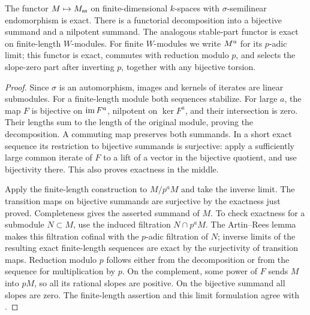 \begin{lemma}\label{lem:A-fitting}
 The functor $M\mapsto M_{\ss}$ on finite-dimensional
$k$-spaces with $\sigma$-semilinear endomorphism is exact.  There is a
functorial decomposition into a bijective summand and a nilpotent summand.
The analogous stable-part functor is exact on finite-length $W$-modules.
For finite $W$-modules we write $M^{\rm u}$ for its $p$-adic limit; this
functor is exact, commutes with reduction modulo $p$, and selects the
slope-zero part after inverting $p$, together with any bijective torsion.
\end{lemma}
\begin{proof}
Since $\sigma$ is an automorphism, images and kernels of iterates are
linear submodules.  For a finite-length module both sequences stabilize.
For large $a$, the map $F$ is bijective on $\im F^a$, nilpotent on
$\ker F^a$, and their intersection is zero.  Their lengths sum to the
length of the original module, proving the decomposition.  A commuting
map preserves both summands.  In a short exact sequence its restriction
to bijective summands is surjective: apply a sufficiently large common
iterate of $F$ to a lift of a vector in the bijective quotient, and use
bijectivity there.  This also proves exactness in the middle.

Apply the finite-length construction to $M/p^aM$ and take the inverse
limit.  The transition maps on bijective summands are surjective by the
exactness just proved.  Completeness gives the asserted summand of $M$.
To check exactness for a submodule $N\subset M$, use the induced
filtration $N\cap p^aM$.  The Artin--Rees lemma makes this filtration
cofinal with the $p$-adic filtration of $N$; inverse limits of the
resulting exact finite-length sequences are exact by the surjectivity
of transition maps.  Reduction modulo $p$ follows either from the
decomposition or from the sequence for multiplication by $p$.
On the complement, some power of $F$ sends $M$ into $pM$, so all its
rational slopes are positive.  On the bijective summand all slopes are
zero.  The finite-length assertion and this limit formulation agree
with \citet[Lemma 4.8 and Remark 4.10]{Ogus1975}.
\end{proof}

